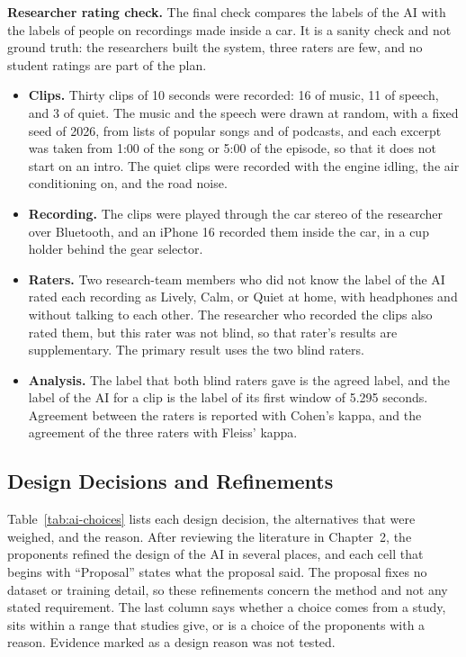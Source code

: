 \textbf{Researcher rating check.} The final check compares the labels of the AI with the labels of people on recordings made inside a car. It is a sanity check and not ground truth: the researchers built the system, three raters are few, and no student ratings are part of the plan.
\begin{itemize}
    \item \textbf{Clips.} Thirty clips of 10 seconds were recorded: 16 of music, 11 of speech, and 3 of quiet. The music and the speech were drawn at random, with a fixed seed of 2026, from lists of popular songs and of podcasts, and each excerpt was taken from 1:00 of the song or 5:00 of the episode, so that it does not start on an intro. The quiet clips were recorded with the engine idling, the air conditioning on, and the road noise.
    \item \textbf{Recording.} The clips were played through the car stereo of the researcher over Bluetooth, and an iPhone 16 recorded them inside the car, in a cup holder behind the gear selector.
    \item \textbf{Raters.} Two research-team members who did not know the label of the AI rated each recording as Lively, Calm, or Quiet at home, with headphones and without talking to each other. The researcher who recorded the clips also rated them, but this rater was not blind, so that rater's results are supplementary. The primary result uses the two blind raters.
    \item \textbf{Analysis.} The label that both blind raters gave is the agreed label, and the label of the AI for a clip is the label of its first window of 5.295 seconds. Agreement between the raters is reported with Cohen's kappa, and the agreement of the three raters with Fleiss' kappa.
\end{itemize}

\subsection{Design Decisions and Refinements}
\label{sec:ai-choices}
Table~\ref{tab:ai-choices} lists each design decision, the alternatives that were weighed, and the reason. After reviewing the literature in Chapter~2, the proponents refined the design of the AI in several places, and each cell that begins with ``Proposal'' states what the proposal said. The proposal fixes no dataset or training detail, so these refinements concern the method and not any stated requirement. The last column says whether a choice comes from a study, sits within a range that studies give, or is a choice of the proponents with a reason. Evidence marked as a design reason was not tested.

